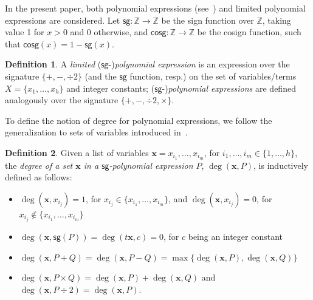 \documentclass[11pt, oneside]{article}
\newcommand{\fun}[1]{\mathsf{#1}}
\newcommand{\tu}[1]{\mathbf{#1}}
\theoremstyle{definition}
\newtheorem{defn}{Definition}
\begin{document}
%
In the present paper, both polynomial expressions (see~\cite{ADK24a}) and limited polynomial expressions are considered.
%
Let $\fun{sg}:\mathbb{Z} \to \mathbb{Z}$ be the sign function over $\mathbb{Z}$, taking value 1 for $x>0$ and 0 otherwise, and $\fun{cosg} :\mathbb{Z}\to \mathbb{Z}$ 
be the cosign function, such that $\fun{cosg}(x)=1-\fun{sg}(x)$. 



\begin{defn}%
    A \emph{limited} ($\fun{sg}$-)\emph{polynomial expression} is an expression  over the signature $\{+, -, \div 2\}$ (and the $\fun{sg}$ function, resp.) on the set of variables/terms $X=\{x_1,\dots, x_h\}$ and integer constants; ($\fun{sg}$-)\emph{polynomial expressions} are defined analogously over the signature $\{ +, -, \div 2,\times\}$.  
\end{defn}






\noindent
To define the notion of degree for polynomial expressions, we follow the generalization to sets of variables introduced in~\cite{ADK24a}.

\begin{defn}
    Given a list of variables $\tu x=x_{i_1},\dots, x_{i_m}$, for $i_1,\dots, i_m \in \{1,\dots, h\}$, the \emph{degree of a set $\tu x$ in a $\fun{sg}$-polynomial expression $P$}, $\deg(\tu x,P)$, is inductively defined as follows:
    \begin{itemize}
        \itemsep0em
        \item $\deg(\tu x, x_{i_j})=1$, for $x_{i_j}\in \{x_{i_1}, \dots, x_{i_m}\}$, and $\deg(\tu x, x_{i_j})=0$, for $x_{i_j}\not\in \{x_{i_1},\dots, x_{i_m}\}$
        \item  $\deg(\tu x, \fun{sg}(P))=\deg(t\tu x, c) = 0$, for $c$ being an integer constant
        \item $\deg(\tu x, P+Q)=\deg(\tu x, P-Q)=\max\{\deg(\tu x, P), \deg(\tu x, Q)\}$
        \item $\deg(\tu x, P\times Q)=\deg(\tu x, P)+\deg(\tu x, Q)$ and $\deg(\tu x, P\div 2)=\deg(\tu x, P)$.
    \end{itemize}
\end{defn}
\end{document}
